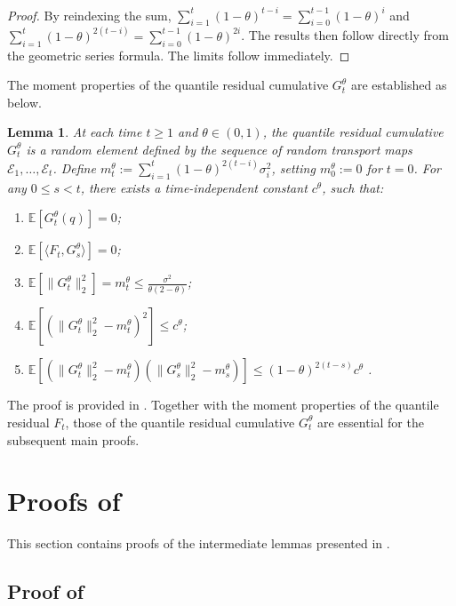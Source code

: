 \documentclass[a4paper, 11pt]{article}
\newcommand{\E}{\mathbb E}
\newcommand{\T}{\mathcal E}
\newtheorem{lemma}{Lemma}
\theoremstyle{definition}
\begin{document}
\begin{proof}
	By reindexing the sum, $\sum_{i=1}^{t} (1 - \theta)^{t-i} = \sum_{i=0}^{t-1} (1 - \theta)^{i}$ and $\sum_{i=1}^{t} (1 - \theta)^{2(t-i)} = \sum_{i=0}^{t-1} (1 - \theta)^{2 i}$.
    The results then follow directly from the geometric series formula.
	The limits follow immediately.
\end{proof}

The moment properties of the quantile residual cumulative $G_t^\theta$ are established as below.

\begin{lemma} \label{lem:g_moment}
	At each time $t \ge 1$ and $\theta \in (0, 1)$, the quantile residual cumulative $G_t^\theta$ is a random element defined by the sequence of random transport maps $\T_1, \dots, \T_t$. 
    Define $m_t^\theta := \sum_{i=1}^{t} (1 - \theta)^{2(t-i)} \sigma_i^2$, setting $m_0^\theta := 0$ for $t = 0$.
    For any $0 \le s < t$, there exists a time-independent constant $c^\theta$, such that:
	\begin{enumerate}
        \item $\E[ G_t^\theta(q) ] = 0$;
        \item $\E[ \langle F_t, G_s^\theta \rangle ] = 0$;
		\item $\E[ \| G_t^\theta \|_2^2 ] = m_t^\theta \le \frac{\sigma^2}{\theta (2 - \theta)}$;
		\item $\E[ ( \| G_t^\theta \|_2^2 - m_t^\theta )^2 ] \le c^\theta$;
		\item $\E[ ( \| G_t^\theta \|_2^2 - m_t^\theta ) ( \| G_s^\theta \|_2^2 - m_s^\theta ) ] \le (1 - \theta)^{2(t-s)} c^\theta$ .
	\end{enumerate}
\end{lemma}

The proof is provided in .
Together with the moment properties of the quantile residual $F_t$, those of the quantile residual cumulative $G_t^\theta$ are essential for the subsequent main proofs.



\section{Proofs of } \label{apx:preparation_proofs}

This section contains proofs of the intermediate lemmas presented in .

\subsection{Proof of } \label{apx:proof_residual_property}
\end{document}
